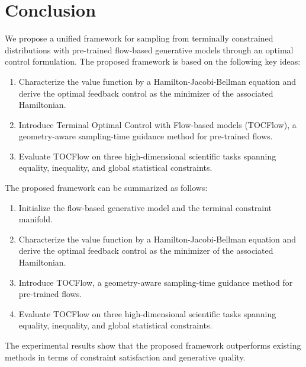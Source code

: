 \documentclass{article}
\begin{document}
        \section{Conclusion}

        We propose a unified framework for sampling from terminally constrained distributions with pre-trained flow-based generative models through an optimal control formulation. The proposed framework is based on the following key ideas:

        \begin{enumerate}
        \item Characterize the value function by a Hamilton-Jacobi-Bellman equation and derive the optimal feedback control as the minimizer of the associated Hamiltonian.
        \item Introduce Terminal Optimal Control with Flow-based models (TOCFlow), a geometry-aware sampling-time guidance method for pre-trained flows.
        \item Evaluate TOCFlow on three high-dimensional scientific tasks spanning equality, inequality, and global statistical constraints.
        \end{enumerate}

        The proposed framework can be summarized as follows:

        \begin{enumerate}
        \item Initialize the flow-based generative model and the terminal constraint manifold.
        \item Characterize the value function by a Hamilton-Jacobi-Bellman equation and derive the optimal feedback control as the minimizer of the associated Hamiltonian.
        \item Introduce TOCFlow, a geometry-aware sampling-time guidance method for pre-trained flows.
        \item Evaluate TOCFlow on three high-dimensional scientific tasks spanning equality, inequality, and global statistical constraints.
        \end{enumerate}

        The experimental results show that the proposed framework outperforms existing methods in terms of constraint satisfaction and generative quality.
\end{document}
